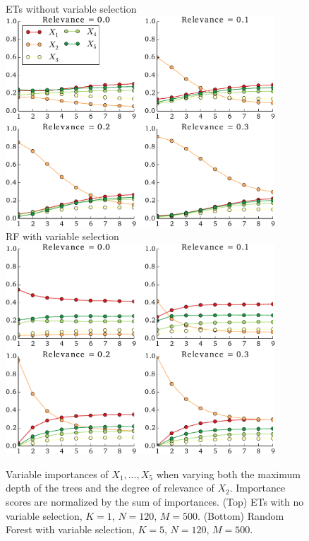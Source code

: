 \begin{figure}
\centering
ETs without variable selection\\[1ex]
\includegraphics[width=0.9\textwidth]{figures/ch7_bias_depth.pdf}\\[2.5ex]
RF with variable selection\\[1ex]
\includegraphics[width=0.9\textwidth]{figures/ch7_bias_depth_rf.pdf}
\caption{Variable importances of $X_1, \dots, X_5$ when varying both the
         maximum depth of the trees and the degree of relevance of $X_2$.
         Importance scores are normalized by the sum of importances.
         (Top) ETs with no variable selection, $K=1$, $N=120$, $M=500$.
         (Bottom) Random Forest with variable selection, $K=5$, $N=120$, $M=500$.}
\label{fig:7:bias:depth}
\end{figure}

